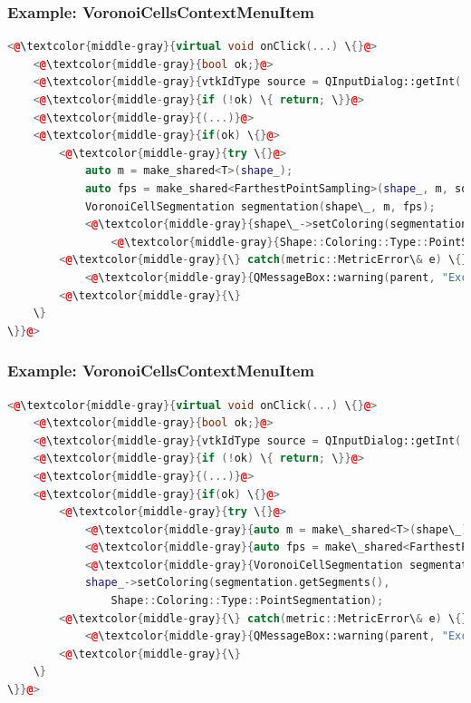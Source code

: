 \documentclass[compress]{beamer}
\begin{document}
\begin{frame}[fragile]
  \frametitle{Example: VoronoiCellsContextMenuItem}
  
\begin{lstlisting}[language=C++, numbers=none]
<@\textcolor{middle-gray}{virtual void onClick(...) \{}@>
    <@\textcolor{middle-gray}{bool ok;}@>
    <@\textcolor{middle-gray}{vtkIdType source = QInputDialog::getInt(...);}@>
    <@\textcolor{middle-gray}{if (!ok) \{ return; \}}@>
    <@\textcolor{middle-gray}{(...)}@>
    <@\textcolor{middle-gray}{if(ok) \{}@>
        <@\textcolor{middle-gray}{try \{}@>
            auto m = make_shared<T>(shape_);
            auto fps = make_shared<FarthestPointSampling>(shape_, m, source, numberOfSegments);
            VoronoiCellSegmentation segmentation(shape\_, m, fps);
            <@\textcolor{middle-gray}{shape\_->setColoring(segmentation.getSegments(), }@>
            	<@\textcolor{middle-gray}{Shape::Coloring::Type::PointSegmentation);}@>
        <@\textcolor{middle-gray}{\} catch(metric::MetricError\& e) \{}@>
            <@\textcolor{middle-gray}{QMessageBox::warning(parent, "Exception", e.what());}@>
        <@\textcolor{middle-gray}{\}
    \}
\}}@>
\end{lstlisting}
  
\end{frame}

\begin{frame}[fragile]
  \frametitle{Example: VoronoiCellsContextMenuItem}
  
\begin{lstlisting}[language=C++, numbers=none]
<@\textcolor{middle-gray}{virtual void onClick(...) \{}@>
    <@\textcolor{middle-gray}{bool ok;}@>
    <@\textcolor{middle-gray}{vtkIdType source = QInputDialog::getInt(...);}@>
    <@\textcolor{middle-gray}{if (!ok) \{ return; \}}@>
    <@\textcolor{middle-gray}{(...)}@>
    <@\textcolor{middle-gray}{if(ok) \{}@>
        <@\textcolor{middle-gray}{try \{}@>
            <@\textcolor{middle-gray}{auto m = make\_shared<T>(shape\_);}@>
            <@\textcolor{middle-gray}{auto fps = make\_shared<FarthestPointSampling>(shape\_, m, source, numberOfSegments);}@>
            <@\textcolor{middle-gray}{VoronoiCellSegmentation segmentation(shape\_, m, fps);}@>
            shape_->setColoring(segmentation.getSegments(), 
            	Shape::Coloring::Type::PointSegmentation);
        <@\textcolor{middle-gray}{\} catch(metric::MetricError\& e) \{}@>
            <@\textcolor{middle-gray}{QMessageBox::warning(parent, "Exception", e.what());}@>
        <@\textcolor{middle-gray}{\}
    \}
\}}@>
\end{lstlisting}

\end{frame}
\end{document}
